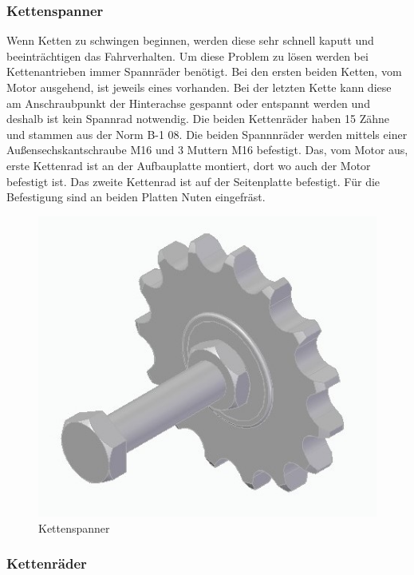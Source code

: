 \subsubsection*{Kettenspanner}

Wenn Ketten zu schwingen beginnen, werden diese sehr schnell kaputt und beeinträchtigen das Fahrverhalten. Um diese Problem zu lösen werden bei Kettenantrieben immer Spannräder benötigt. Bei den ersten beiden Ketten, vom Motor ausgehend, ist jeweils eines vorhanden. Bei der letzten Kette kann diese am Anschraubpunkt der Hinterachse gespannt oder entspannt werden und deshalb ist kein Spannrad notwendig. Die beiden Kettenräder haben 15 Zähne und stammen aus der Norm B-1 08. Die beiden Spannnräder werden mittels einer Außensechskantschraube M16 und 3 Muttern M16 befestigt. Das, vom Motor aus, erste Kettenrad ist an der Aufbauplatte montiert, dort wo auch der Motor befestigt ist. Das zweite Kettenrad ist auf der Seitenplatte befestigt.  Für die Befestigung sind an beiden Platten Nuten eingefräst.


\begin{figure} [H]
	\begin{center}
		\includegraphics[scale=0.3]{figures/mechanik/14099505.jpg}
			\caption{Kettenspanner}
			\label{fig:Kettenspanner}
	\end{center}
\end{figure}

\newpage

\subsubsection*{Kettenräder}

